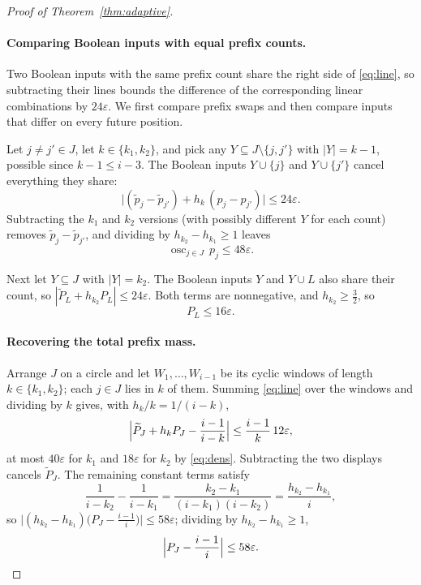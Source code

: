 \documentclass[10pt]{article} %
\theoremstyle{definition}
\DeclareMathOperator{\osc}{osc}
\begin{document}
\begin{proof}[Proof of Theorem~\ref{thm:adaptive}]
\paragraph{Comparing Boolean inputs with equal prefix counts.}
Two Boolean inputs with the same prefix count share the right side of
\eqref{eq:line}, so subtracting their lines bounds the difference of
the corresponding linear combinations by \(24\varepsilon\).  We first compare prefix
swaps and then compare inputs that differ on every future position.

Let \(j\ne j'\in J\), let \(k\in\{k_1,k_2\}\), and pick
any \(Y\subseteq J\setminus\{j,j'\}\) with \(|Y|=k-1\), possible since
\(k-1\le i-3\).  The Boolean inputs \(Y\cup\{j\}\) and \(Y\cup\{j'\}\) cancel
everything they share:
\[
 \bigl|(\tilde p_j-\tilde p_{j'})+h_k\,(p_j-p_{j'})\bigr|\le24\varepsilon .
\]
Subtracting the \(k_1\) and \(k_2\) versions (with possibly different
\(Y\) for each count) removes \(\tilde p_j-\tilde p_{j'}\), and dividing by
\(h_{k_2}-h_{k_1}\ge1\) leaves
\begin{equation}\label{eq:osc}
 \osc_{j\in J}\,p_j\le48\varepsilon .
\end{equation}

Next let \(Y\subseteq J\) with \(|Y|=k_2\).  The Boolean inputs \(Y\) and
\(Y\cup L\) also share their count, so
\(|\widetilde P_L+h_{k_2}P_L|\le24\varepsilon\).  Both terms are
nonnegative, and \(h_{k_2}\ge\tfrac32\), so
\begin{equation}\label{eq:fut}
 P_L\le16\varepsilon .
\end{equation}

\paragraph{Recovering the total prefix mass.}
Arrange \(J\) on a circle and let \(W_1,\dots,W_{i-1}\) be its cyclic
windows of length \(k\in\{k_1,k_2\}\); each \(j\in J\) lies in
\(k\) of them.  Summing \eqref{eq:line} over the windows and dividing by
\(k\) gives, with
\(h_k/k=1/(i-k)\),
\[
 \Bigl|\widetilde P_J+h_kP_J-\frac{i-1}{i-k}\Bigr|
 \le\frac{i-1}k\,12\varepsilon ,
\]
at most \(40\varepsilon\) for \(k_1\) and \(18\varepsilon\) for \(k_2\)
by \eqref{eq:dens}.  Subtracting the two displays cancels
\(\widetilde P_J\).  The remaining constant terms satisfy
\[
 \frac1{i-k_2}-\frac1{i-k_1}
 =\frac{k_2-k_1}{(i-k_1)(i-k_2)}
 =\frac{h_{k_2}-h_{k_1}}i ,
\]
so \(\bigl|(h_{k_2}-h_{k_1})\bigl(P_J-\frac{i-1}i\bigr)\bigr|
\le58\varepsilon\); dividing by \(h_{k_2}-h_{k_1}\ge1\),
\begin{equation}\label{eq:tot}
 \Bigl|P_J-\frac{i-1}i\Bigr|\le58\varepsilon .
\end{equation}


\end{proof}
\end{document}
